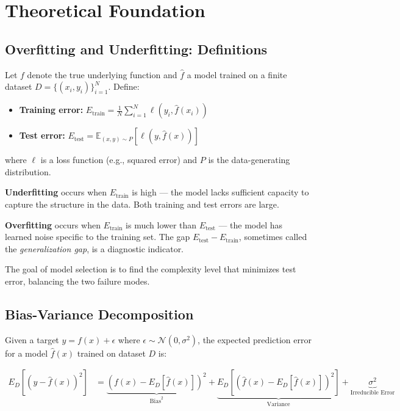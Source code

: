 \documentclass[12pt, a4paper]{article}
\begin{document}
\section{Theoretical Foundation}
\label{sec:theory}

\subsection{Overfitting and Underfitting: Definitions}

Let $f$ denote the true underlying function and $\hat{f}$ a model trained on a finite
dataset $D = \{(x_i, y_i)\}_{i=1}^N$. Define:
\begin{itemize}
    \item \textbf{Training error:} $E_{\text{train}} = \frac{1}{N}\sum_{i=1}^N \ell(y_i, \hat{f}(x_i))$
    \item \textbf{Test error:} $E_{\text{test}} = \mathbb{E}_{(x,y)\sim P}\left[\ell(y, \hat{f}(x))\right]$
\end{itemize}
where $\ell$ is a loss function (e.g., squared error) and $P$ is the data-generating
distribution.

\textbf{Underfitting} occurs when $E_{\text{train}}$ is high --- the model lacks
sufficient capacity to capture the structure in the data. Both training and test errors
are large.

\textbf{Overfitting} occurs when $E_{\text{train}}$ is much lower than $E_{\text{test}}$
--- the model has learned noise specific to the training set. The gap
$E_{\text{test}} - E_{\text{train}}$, sometimes called the \emph{generalization gap},
is a diagnostic indicator.

The goal of model selection is to find the complexity level that minimizes test error,
balancing the two failure modes.

\subsection{Bias-Variance Decomposition}

Given a target $y = f(x) + \epsilon$ where $\epsilon \sim \mathcal{N}(0, \sigma^2)$,
the expected prediction error for a model $\hat{f}(x)$ trained on dataset $D$ is:

\begin{align}
E_D\left[(y - \hat{f}(x))^2\right]
&= \underbrace{\left(f(x) - E_D[\hat{f}(x)]\right)^2}_{\text{Bias}^2}
+ \underbrace{E_D\left[(\hat{f}(x) - E_D[\hat{f}(x)])^2\right]}_{\text{Variance}}
+ \underbrace{\sigma^2}_{\text{Irreducible Error}}
\label{eq:bias-variance}
\end{align}
\end{document}
